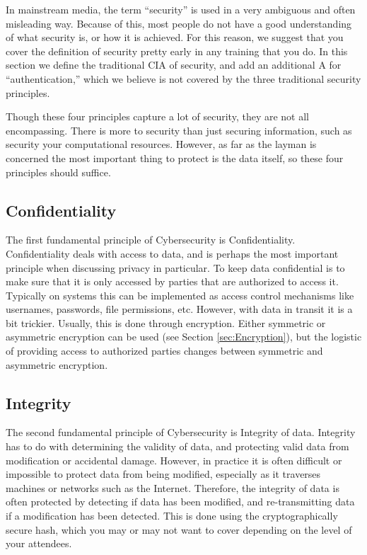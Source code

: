 In mainstream media, the term ``security'' is used in a very ambiguous and often misleading way. Because of this, most people do not have a good understanding of what security is, or how it is achieved. For this reason, we suggest that you cover the definition of security pretty early in any training that you do. In this section we define the traditional CIA of security, and add an additional A for ``authentication,'' which we believe is not covered by the three traditional security principles.  

Though these four principles capture a lot of security, they are not all encompassing. There is more to security than just securing information, such as security your computational resources. However, as far as the layman is concerned the most important thing to protect is the data itself, so these four principles should suffice.

\subsection{Confidentiality}

The first fundamental principle of Cybersecurity is Confidentiality. Confidentiality deals with access to data, and is perhaps the most important principle when discussing privacy in particular. To keep data confidential is to make sure that it is only accessed by parties that are authorized to access it. Typically on systems this can be implemented as access control mechanisms like usernames, passwords, file permissions, etc. However, with data in transit it is a bit trickier. Usually, this is done through encryption. Either symmetric or asymmetric encryption can be used (see Section \ref{sec:Encryption}), but the logistic of providing access to authorized parties changes between symmetric and asymmetric encryption.

\subsection{Integrity}

The second fundamental principle of Cybersecurity is Integrity of data. Integrity has to do with determining the validity of data, and protecting valid data from modification or accidental damage. However, in practice it is often difficult or impossible to protect data from being modified, especially as it traverses machines or networks such as the Internet. Therefore, the integrity of data is often protected by detecting if data has been modified, and re-transmitting data if a modification has been detected. This is done using the cryptographically secure hash, which you may or may not want to cover depending on the level of your attendees. 

